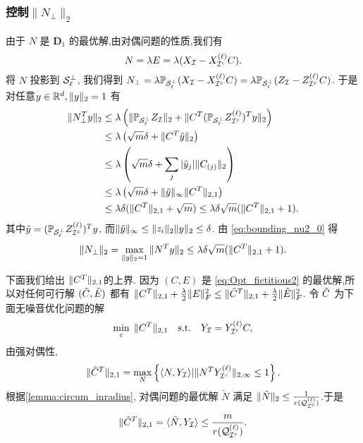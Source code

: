 \subsubsection{控制\(\|N_{\perp}\|_2\)}
由于 \(N\) 是 \(\mathbf{D}_1\) 的最优解,由对偶问题的性质,我们有
\[ N=\lambda E=\lambda(X_{\mathcal{I}}-X^{(\ell)}_{\mathcal{I}^c}C). \]
将 \(N\) 投影到 \(\mathcal{S}^{\perp}_{\ell}\), 我们得到
\(N_{\perp}=\lambda \mathbb{P}_{\mathcal{S}_{\ell}^{\perp}}(X_{\mathcal{I}}-X^{(\ell)}_{\mathcal{I}^c}C)
= \lambda \mathbb{P}_{\mathcal{S}_{\ell}^{\perp}}(Z_{\mathcal{I}}-Z^{(\ell)}_{\mathcal{I}^c}C)\).
于是对任意\(y\in \mathbb{R}^d, \|y\|_2=1\) 有
\begin{align}
  \|N_{\perp}^T y\|_2 & \leq\lambda \left(\|\mathbb{P}_{\mathcal{S}_{\ell}^{\perp}}Z_{\mathcal{I}}\|_2
  +\|C^T (\mathbb{P}_{\mathcal{S}_{\ell}^{\perp}}Z^{(\ell)}_{\mathcal{I}^c})^T y\|_2\right)\nonumber\\
  & \leq \lambda\left( \sqrt{m} \delta + \|C^T \tilde{y}\|_2\right) \nonumber\\
  & \leq \lambda\left( \sqrt{m} \delta + \sum_j |\tilde{y}_j|\|C_{(j)}\|_2\right) \nonumber\\
  & \leq \lambda\left( \sqrt{m} \delta + \|\tilde{y}\|_{\infty}\|C^T\|_{2,1}\right) \nonumber\\
  & \leq \lambda \delta(\|C^T\|_{2,1}+\sqrt{m}) \leq \lambda\delta\sqrt{m}(\|C^T\|_{2,1}+1).
  \label{eq:bounding_nu2_0}
\end{align}
其中\(\tilde{y}=(\mathbb{P}_{\mathcal{S}_{\ell}^{\perp}}Z^{(\ell)}_{\mathcal{I}^c})^Ty\),
而\(\|\tilde{y}\|_\infty \leq \|z_i\|_2 \|y\|_2 \leq
\delta\). 由 \eqref{eq:bounding_nu2_0} 得
\begin{align}
  \|N_{\perp}\|_2 = \max_{\|y\|_2=1} \|N^T y\|_2 \le \lambda\delta\sqrt{m}(\|C^T\|_{2,1}+1).
  \label{eq:bounding_nu2}
\end{align}

下面我们给出 \(\|C^T\|_{2,1}\)的上界.
因为 \((C,E)\) 是 \eqref{eq:Opt_fictitious2} 的最优解,所以对任何可行解 \((\tilde{C} ,\tilde{E})\)
都有 \(\|C^T\|_{2,1}+\frac{\lambda}{2}\|E\|^2_F \leq \|\tilde{C}^T\|_{2,1}+\frac{\lambda}{2}\|\tilde{E}\|_F^2\).
令 \(\tilde{C}\) 为下面无噪音优化问题的解
\begin{align}\label{eq:Opt_y only}
\min_{c} \; \|C^T\|_{2,1} \quad
\text{s.t.} \quad Y_{\mathcal{I}}=Y^{(\ell)}_{\mathcal{I}^c}C,
\end{align}
由强对偶性,
\[\|\tilde{C}^T\|_{2,1} = \max_{N}\left\{\langle N,Y_{\mathcal{I}}\rangle | \|N^T
Y^{(\ell)}_{\mathcal{I}^c}\|_{2, \infty}\leq 1\right\}.\]
根据\autoref{lemma:circum_inradius},   对偶问题的最优解 \(\tilde{N}\) 满足
\(\|\tilde{N}\|_2 \leq \frac{1}{r(\mathcal{Q}_{\mathcal{I}^c}^{(\ell)})}\).于是
\[\|\tilde{C}^T\|_{2,1} = \langle\tilde{N},Y_{\mathcal{I}}\rangle \leq
\frac{m}{r(\mathcal{Q}_{\mathcal{I}^c}^{(\ell)})}.\]

